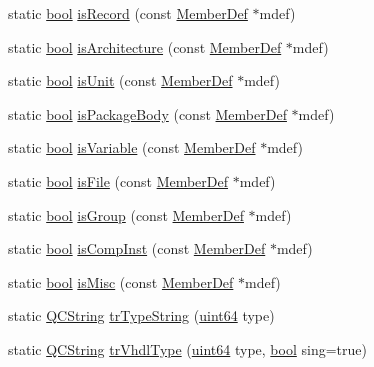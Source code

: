 \begin{DoxyCompactItemize}
static \hyperlink{qglobal_8h_a1062901a7428fdd9c7f180f5e01ea056}{bool} \hyperlink{class_vhdl_doc_gen_ac0634a061165ad22c27eef2ac12057d0}{is\+Record} (const \hyperlink{class_member_def}{Member\+Def} $\ast$mdef)
\item 
static \hyperlink{qglobal_8h_a1062901a7428fdd9c7f180f5e01ea056}{bool} \hyperlink{class_vhdl_doc_gen_a0281ffc4e374d27d703419ae289e3b8c}{is\+Architecture} (const \hyperlink{class_member_def}{Member\+Def} $\ast$mdef)
\item 
static \hyperlink{qglobal_8h_a1062901a7428fdd9c7f180f5e01ea056}{bool} \hyperlink{class_vhdl_doc_gen_a4861484cc952d96afcfe277cf958aff0}{is\+Unit} (const \hyperlink{class_member_def}{Member\+Def} $\ast$mdef)
\item 
static \hyperlink{qglobal_8h_a1062901a7428fdd9c7f180f5e01ea056}{bool} \hyperlink{class_vhdl_doc_gen_ab6e9aff43352b39d31806d0616e2c7af}{is\+Package\+Body} (const \hyperlink{class_member_def}{Member\+Def} $\ast$mdef)
\item 
static \hyperlink{qglobal_8h_a1062901a7428fdd9c7f180f5e01ea056}{bool} \hyperlink{class_vhdl_doc_gen_a877e8a81695500e7ad5ed8d76fdbaffc}{is\+Variable} (const \hyperlink{class_member_def}{Member\+Def} $\ast$mdef)
\item 
static \hyperlink{qglobal_8h_a1062901a7428fdd9c7f180f5e01ea056}{bool} \hyperlink{class_vhdl_doc_gen_a7ac9c26b1b0fb7402cc58acaf569df89}{is\+File} (const \hyperlink{class_member_def}{Member\+Def} $\ast$mdef)
\item 
static \hyperlink{qglobal_8h_a1062901a7428fdd9c7f180f5e01ea056}{bool} \hyperlink{class_vhdl_doc_gen_a069c8ad206be372bd948cc8e964218ed}{is\+Group} (const \hyperlink{class_member_def}{Member\+Def} $\ast$mdef)
\item 
static \hyperlink{qglobal_8h_a1062901a7428fdd9c7f180f5e01ea056}{bool} \hyperlink{class_vhdl_doc_gen_ab9e42b2cf2d969dcc943ec355d4fa6b2}{is\+Comp\+Inst} (const \hyperlink{class_member_def}{Member\+Def} $\ast$mdef)
\item 
static \hyperlink{qglobal_8h_a1062901a7428fdd9c7f180f5e01ea056}{bool} \hyperlink{class_vhdl_doc_gen_a55ef68e914c38033a48b6fdac2907689}{is\+Misc} (const \hyperlink{class_member_def}{Member\+Def} $\ast$mdef)
\item 
static \hyperlink{class_q_c_string}{Q\+C\+String} \hyperlink{class_vhdl_doc_gen_a3ff9c5f9b1c16d7212fafcd9e7275223}{tr\+Type\+String} (\hyperlink{qglobal_8h_a29940ae63ec06c9998bba873e25407ad}{uint64} type)
\item 
static \hyperlink{class_q_c_string}{Q\+C\+String} \hyperlink{class_vhdl_doc_gen_a1f0a09f2f2d063e9fc551ee62473eb43}{tr\+Vhdl\+Type} (\hyperlink{qglobal_8h_a29940ae63ec06c9998bba873e25407ad}{uint64} type, \hyperlink{qglobal_8h_a1062901a7428fdd9c7f180f5e01ea056}{bool} sing=true)

\end{DoxyCompactItemize}
